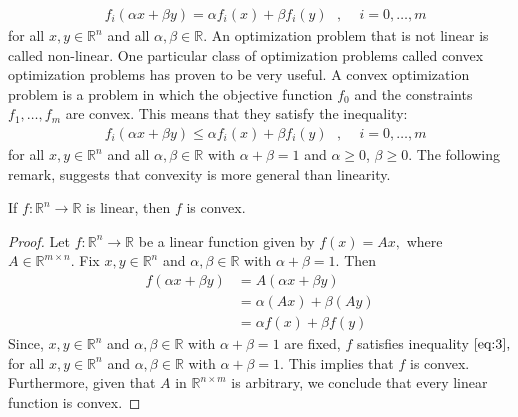 \begin{equation*}\label{eq:2}\tag{2.2}
\begin{aligned}
    &f_{i}(\alpha x + \beta y) = \alpha f_{i}(x) + \beta f_{i}(y) \text{ } \text{,}\text{     }\text{  }i=0,\ldots,m
\end{aligned}
\end{equation*}
for all $x,y \in \mathbb{R}^{n}$ and all $\alpha,\beta \in \mathbb{R}$. An optimization problem that is not linear is called non-linear. One particular class of optimization problems called convex optimization problems has proven to be very useful. A convex optimization problem is a problem in which the objective function $f_{0}$ and the constraints $f_{1},\ldots,f_{m}$ are convex. This means that they satisfy the inequality:
\begin{equation*}\label{eq:3}\tag{2.3}
\begin{aligned}
    &f_{i}(\alpha x + \beta y) \leq \alpha f_{i}(x) + \beta f_{i}(y) \text{ } \text{,}\text{    }\text{  }i=0,\ldots,m
\end{aligned}
\end{equation*}
for all $x,y \in \mathbb{R}^{n}$ and all $\alpha,\beta \in \mathbb{R}$ with $\alpha + \beta = 1$ and $\alpha \geq 0$, $\beta \geq 0$. The following remark, suggests that convexity is more general than linearity.
\begin{remark}\label{linear_imp_convexity}
If $f:\mathbb{R}^{n}\rightarrow\mathbb{R}$ is linear, then $f$ is convex.    
\end{remark}
\begin{proof}
Let $f:\mathbb{R}^{n}\rightarrow\mathbb{R}$ be a linear function given by $f(x)=Ax,$ where $A\in\mathbb{R}^{m\times n}.$ Fix $x,y\in\mathbb{R}^{n}$ and $\alpha,\beta\in\mathbb{R}$ with $\alpha+\beta=1.$ Then
\begin{equation*}\tag{2.4}
\begin{aligned}
f(\alpha x + \beta y)
    &= A(\alpha x + \beta y)\\
    &= \alpha(Ax) + \beta(Ay)\\
    &= \alpha f(x) + \beta f(y)
\end{aligned}
\end{equation*}
Since, $x,y \in\mathbb{R}^{n}$ and $\alpha,\beta\in\mathbb{R}$ with $\alpha+\beta=1$ are fixed, $f$ satisfies inequality $\eqref{eq:3},$ for all $x, y\in\mathbb{R}^{n}$ and $\alpha, \beta\in\mathbb{R}$ with $\alpha+\beta=1.$ This implies that $f$ is convex. Furthermore, given that $A$ in $\mathbb{R}^{n\times m}$ is arbitrary, we conclude that every linear function is convex.
\end{proof}

